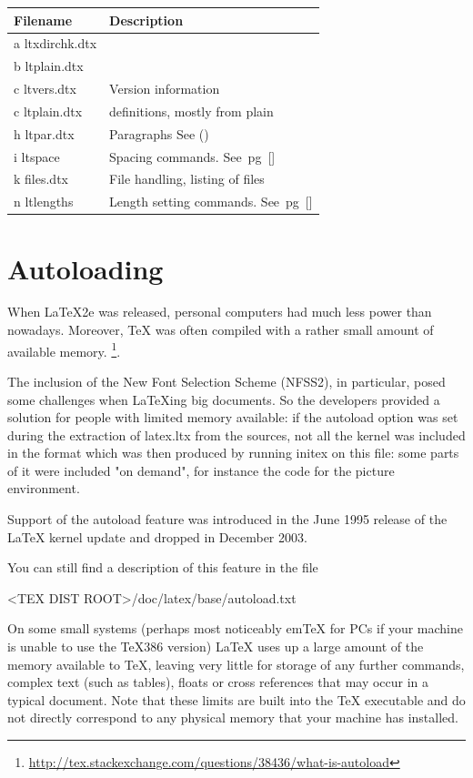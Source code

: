 {\RaggedRight
\centering

\begin{tabular}{lp{5cm}}
\toprule
Filename  &Description \\
\midrule
a ltxdirchk.dtx &        \\
b ltplain.dtx    &        \\
c ltvers.dtx     & Version information       \\
c ltplain.dtx    & definitions, mostly from plain\\
h ltpar.dtx      & Paragraphs See (\pageref{pars})\\
i  ltspace        &Spacing commands. See~pg~[\pageref{spc}]\\
k files.dtx       & File handling, listing of files\\
n ltlengths      & Length setting commands. See~pg~[\pageref{kernel:lengths}]\\
\bottomrule
\end{tabular}
}

\section{Autoloading}

When LaTeX2e was released, personal computers had much less power than nowadays. Moreover, TeX was often compiled with a rather small amount of available memory.
\footnote{\url{http://tex.stackexchange.com/questions/38436/what-is-autoload}}.

The inclusion of the New Font Selection Scheme (NFSS2), in particular, posed some challenges when LaTeXing big documents. So the developers provided a solution for people with limited memory available: if the autoload option was set during the extraction of latex.ltx from the sources, not all the kernel was included in the format which was then produced by running initex on this file: some parts of it were included "on demand", for instance the code for the picture environment.

Support of the autoload feature was introduced in the June 1995 release of the LaTeX kernel update and dropped in December 2003.

You can still find a description of this feature in the file

<TEX DIST ROOT>/doc/latex/base/autoload.txt

On some small systems (perhaps most noticeably emTeX for PCs if your machine is unable to use the TeX386 version) LaTeX uses up a large amount of the memory available to TeX, leaving very little for storage of any further commands, complex text (such as tables), floats or cross references that may occur in a typical document. Note that these limits are built into the TeX executable and do not directly correspond to any physical memory that your machine has installed.

